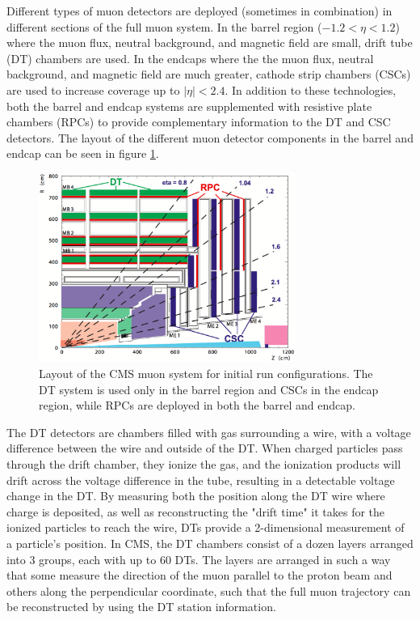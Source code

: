 Different types of muon detectors are deployed (sometimes in combination) in different sections of the full muon system. In the barrel region ($-1.2<\eta<1.2$) where the muon flux, neutral background, and magnetic field are small, drift tube (DT) chambers are used. In the endcaps where the the muon flux, neutral background, and magnetic field are much greater, cathode strip chambers (CSCs) are used to increase coverage up to $|\eta|<2.4$. In addition to these technologies, both the barrel and endcap systems are supplemented with resistive plate chambers (RPCs) to provide complementary information to the DT and CSC detectors. The layout of the different muon detector components in the barrel and endcap can be seen in figure \ref{fig:muonGeometry}.
 \begin{figure}
	\centering
	\includegraphics[width=0.75\textwidth]{detector/figs/muonGeometry}
	\caption{Layout of the CMS muon system for initial run configurations. The DT system is used only in the barrel region and CSCs in the endcap region, while RPCs are deployed in both the barrel and endcap.}
	\label{fig:muonGeometry}
\end{figure}

The DT detectors are chambers filled with gas surrounding a wire, with a voltage difference between the wire and outside of the DT. When charged particles pass through the drift chamber, they ionize the gas, and the ionization products will drift across the voltage difference in the tube, resulting in a detectable voltage change in the DT. By measuring both the position along the DT wire where charge is deposited, as well as reconstructing the "drift time" it takes for the ionized particles to reach the wire, DTs provide a 2-dimensional measurement of a particle's position. In CMS, the DT chambers consist of a dozen layers arranged into 3 groups, each with up to 60 DTs. The layers are arranged in such a way that some measure the direction of the muon parallel to the proton beam and others along the perpendicular coordinate, such that the full muon trajectory can be reconstructed by using the DT station information.

